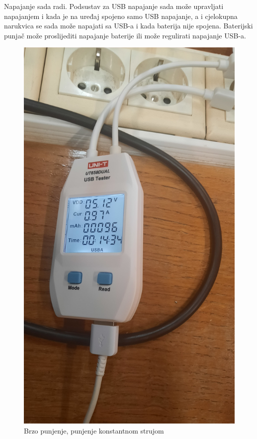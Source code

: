 Napajanje sada radi. Podsustav za USB napajanje sada može upravljati napajanjem i kada je na uređaj spojeno samo USB napajanje, a i cjelokupna narukvica se sada može napajati sa USB-a i kada baterija nije spojena. Baterijski punjač može proslijediti napajanje baterije ili može regulirati napajanje USB-a.
\begin{figure}[htb]
    \centering
    \includegraphics[width=10 cm]{Figures/BR_TEST_04.jpg}
    \caption{Brzo punjenje, punjenje konstantnom strujom}
    \label{slk:BR_TEST_04}
\end{figure}
